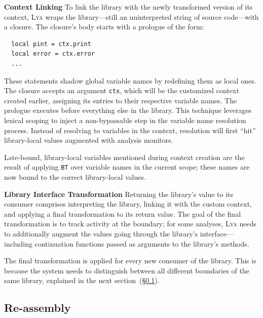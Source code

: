 \documentclass[letterpaper,twocolumn,10pt]{article}
\newcommand{\heading}[1]{\vspace{2pt}\noindent\textbf{#1}\enspace}
\newcommand{\ttt}[1]{\texttt{#1}}
\newcommand{\sx}[1]{(\S\ref{#1})}
\newcommand{\sys}{{\scshape Lya}\xspace}
\newcommand{\fixme}[1]{{\color{red}#1}}
\begin{document}
\heading{Context Linking}
To link the library with the newly transformed version of its context, \sys wraps the library---still an uninterpreted string of source code---with a closure.
The closure's body starts with a prologue of the form:
\begin{verbatim}
  local pint = ctx.print
  local error = ctx.error
  ...
\end{verbatim}
These statements shadow global variable names by redefining them as local ones.
The closure accepts an argument \ttt{ctx}, which will be the customized context created earlier, assigning its entries to their respective variable names.
The prologue executes before everything else in the library.
This technique leverages lexical scoping to inject a non-bypassable step in the variable name resolution process.
Instead of resolving to variables in the context, resolution will first ``hit'' library-local values augmented with analysis monitors.

Late-bound, library-local variables mentioned during context creation are the result of applying \fixme{\ttt{BT}} over variable names in the current scope;
  these names are now bound to the correct library-local values.

\heading{Library Interface Transformation}
Returning the library's value to its consumer comprises interpreting the library, linking it with the custom context, and applying a final transformation to its return value.
The goal of the final transformation is to track activity at the boundary;
  for some analyses, \sys needs to additionally augment the values going through the library's interface---including continuation functions passed as arguments to the library's methods.

The final transformation is applied for every new consumer of the library.
This is because the system needs to distinguish between all different boundaries of the same library, explained in the next section~\sx{three}.
  

\subsection{Re-assembly}
\label{three}
\end{document}
